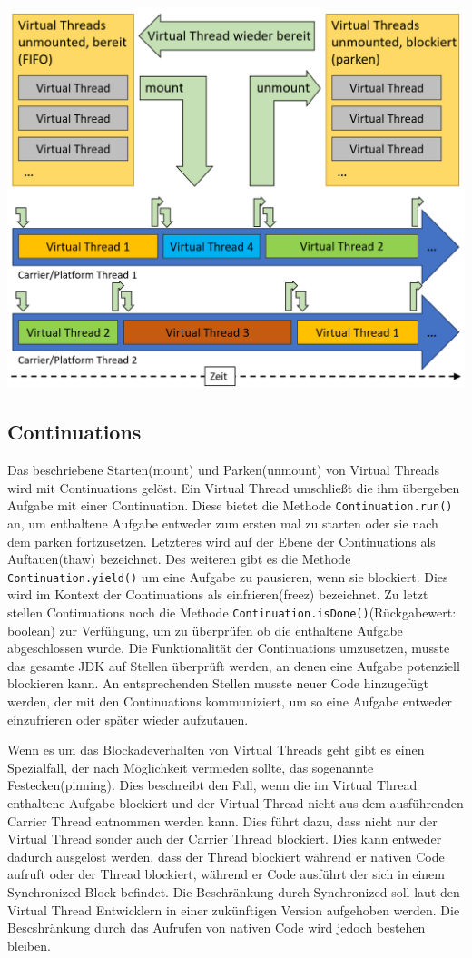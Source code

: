 \documentclass[fontsize=12pt,paper=a4,twoside=semi,parskip=half-,headsepline,headinclude]{scrreprt}
\newcommand{\code}[1]{\texttt{#1}}
\begin{document}
\includegraphics[scale=0.5]{figures/VirtualThreadsAblauf.png}

\subsection{Continuations}

Das beschriebene Starten(mount) und Parken(unmount) von Virtual Threads wird mit Continuations gelöst. Ein Virtual Thread umschließt die ihm übergeben Aufgabe mit einer Continuation. Diese bietet die Methode \code{Continuation.run()} an, um enthaltene Aufgabe entweder zum ersten mal zu starten oder sie nach dem parken fortzusetzen. Letzteres wird auf der Ebene der Continuations als Auftauen(thaw) bezeichnet. Des weiteren gibt es die Methode \code{Continuation.yield()} um eine Aufgabe zu pausieren, wenn sie blockiert. Dies wird im Kontext der Continuations als einfrieren(freez) bezeichnet. Zu letzt stellen Continuations noch die Methode \code{Continuation.isDone()}(Rückgabewert: boolean) zur Verfühgung, um zu überprüfen ob die enthaltene Aufgabe abgeschlossen wurde. Die Funktionalität der Continuations umzusetzen, musste das gesamte JDK auf Stellen überprüft werden, an denen eine Aufgabe potenziell blockieren kann. An entsprechenden Stellen musste neuer Code hinzugefügt werden, der mit den Continuations kommuniziert, um so eine Aufgabe entweder einzufrieren oder später wieder aufzutauen.

Wenn es um das Blockadeverhalten von Virtual Threads geht gibt es einen Spezialfall, der nach Möglichkeit vermieden sollte, das sogenannte Festecken(pinning). Dies beschreibt den Fall, wenn die im Virtual Thread enthaltene Aufgabe blockiert und der Virtual Thread nicht aus dem ausführenden Carrier Thread entnommen werden kann. Dies führt dazu, dass nicht nur der Virtual Thread sonder auch der Carrier Thread blockiert. Dies kann entweder dadurch ausgelöst werden, dass der Thread blockiert während er nativen Code aufruft oder der Thread blockiert, während er Code ausführt der sich in einem Synchronized Block befindet. Die Beschränkung durch Synchronized soll laut den Virtual Thread Entwicklern in einer zukünftigen Version aufgehoben werden. Die Bescshränkung durch das Aufrufen von nativen Code wird jedoch bestehen bleiben.
\end{document}
